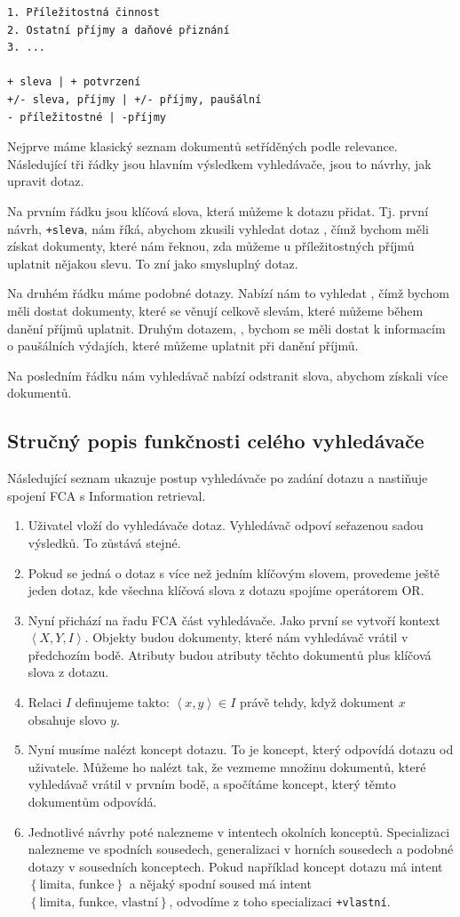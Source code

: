 \documentclass[12pt]{article}
\newcommand{\code}[1]{\texttt{#1}}
\newcommand{\ssection}[1]{\subsection{#1}}
\newcommand{\adds}[1]{\left\{#1\right\}}
\newcommand{\addsp}[1]{\left<#1\right>}
\newcommand{\context}{\addsp{X, Y, I}}
\begin{document}
\begin{verbatim}
1. Příležitostná činnost
2. Ostatní příjmy a daňové přiznání
3. ...

+ sleva | + potvrzení
+/- sleva, příjmy | +/- příjmy, paušální
- příležitostné | -příjmy
\end{verbatim}

Nejprve máme klasický seznam dokumentů setříděných podle relevance. Následující tři řádky jsou hlavním výsledkem vyhledávače, jsou to návrhy, jak upravit dotaz. 

Na prvním řádku jsou klíčová slova, která můžeme k dotazu přidat. Tj. první návrh, \code{+sleva}, nám říká, abychom zkusili vyhledat dotaz , čímž bychom měli získat dokumenty, které nám řeknou, zda můžeme u příležitostných příjmů uplatnit nějakou slevu. To zní jako smysluplný dotaz. 

Na druhém řádku máme podobné dotazy. Nabízí nám to vyhledat , čímž bychom měli dostat dokumenty, které se věnují celkově slevám, které můžeme během danění příjmů uplatnit. Druhým dotazem, , bychom se měli dostat k informacím o paušálních výdajích, které můžeme uplatnit při danění příjmů. 

Na posledním řádku nám vyhledávač nabízí odstranit slova, abychom získali více dokumentů. 


\ssection{Stručný popis funkčnosti celého vyhledávače}
Následující seznam ukazuje postup vyhledávače po zadání dotazu a nastiňuje spojení FCA s Information retrieval. 
\begin{enumerate}
	\item Uživatel vloží do vyhledávače dotaz. Vyhledávač odpoví seřazenou sadou výsledků. To zůstává stejné.
	\item Pokud se jedná o dotaz s více než jedním klíčovým slovem, provedeme ještě jeden dotaz, kde všechna klíčová slova z dotazu spojíme operátorem OR.
	\item Nyní přichází na řadu FCA část vyhledávače. Jako první se vytvoří kontext $\context$. Objekty budou dokumenty, které nám vyhledávač vrátil v předchozím bodě. Atributy budou atributy těchto dokumentů plus klíčová slova z dotazu. 
	\item Relaci $I$ definujeme takto: $\addsp{x, y}\in I$ právě tehdy, když dokument $x$ obsahuje slovo $y$.
	\item Nyní musíme nalézt koncept dotazu. To je koncept, který odpovídá dotazu od uživatele. Můžeme ho nalézt tak, že vezmeme množinu dokumentů, které vyhledávač vrátil v prvním bodě, a spočítáme koncept, který těmto dokumentům odpovídá. 
	\item Jednotlivé návrhy poté nalezneme v intentech okolních konceptů. Specializaci nalezneme ve spodních sousedech, generalizaci v horních sousedech a podobné dotazy v sousedních konceptech. Pokud například koncept dotazu má intent $\adds{\mbox{limita, funkce}}$ a nějaký spodní soused má intent $\adds{\mbox{limita, funkce, vlastní}}$, odvodíme z toho specializaci \code{+vlastní}. 
\end{enumerate}
\end{document}
